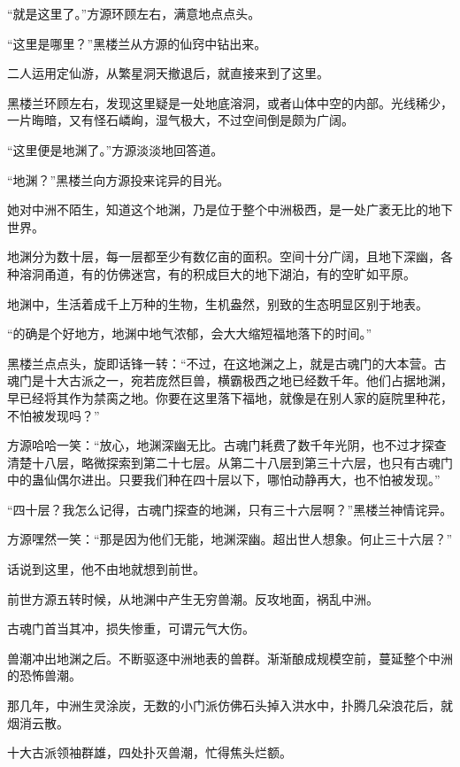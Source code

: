 
\begin{this_body}

“就是这里了。”方源环顾左右，满意地点点头。

“这里是哪里？”黑楼兰从方源的仙窍中钻出来。

二人运用定仙游，从繁星洞天撤退后，就直接来到了这里。

黑楼兰环顾左右，发现这里疑是一处地底溶洞，或者山体中空的内部。光线稀少，一片晦暗，又有怪石嶙峋，湿气极大，不过空间倒是颇为广阔。

“这里便是地渊了。”方源淡淡地回答道。

“地渊？”黑楼兰向方源投来诧异的目光。

她对中洲不陌生，知道这个地渊，乃是位于整个中洲极西，是一处广袤无比的地下世界。

地渊分为数十层，每一层都至少有数亿亩的面积。空间十分广阔，且地下深幽，各种溶洞甬道，有的仿佛迷宫，有的积成巨大的地下湖泊，有的空旷如平原。

地渊中，生活着成千上万种的生物，生机盎然，别致的生态明显区别于地表。

“的确是个好地方，地渊中地气浓郁，会大大缩短福地落下的时间。”

黑楼兰点点头，旋即话锋一转：“不过，在这地渊之上，就是古魂门的大本营。古魂门是十大古派之一，宛若庞然巨兽，横霸极西之地已经数千年。他们占据地渊，早已经将其作为禁脔之地。你要在这里落下福地，就像是在别人家的庭院里种花，不怕被发现吗？”

方源哈哈一笑：“放心，地渊深幽无比。古魂门耗费了数千年光阴，也不过才探查清楚十八层，略微探索到第二十七层。从第二十八层到第三十六层，也只有古魂门中的蛊仙偶尔进出。只要我们种在四十层以下，哪怕动静再大，也不怕被发现。”

“四十层？我怎么记得，古魂门探查的地渊，只有三十六层啊？”黑楼兰神情诧异。

方源嘿然一笑：“那是因为他们无能，地渊深幽。超出世人想象。何止三十六层？”

话说到这里，他不由地就想到前世。

前世方源五转时候，从地渊中产生无穷兽潮。反攻地面，祸乱中洲。

古魂门首当其冲，损失惨重，可谓元气大伤。

兽潮冲出地渊之后。不断驱逐中洲地表的兽群。渐渐酿成规模空前，蔓延整个中洲的恐怖兽潮。

那几年，中洲生灵涂炭，无数的小门派仿佛石头掉入洪水中，扑腾几朵浪花后，就烟消云散。

十大古派领袖群雄，四处扑灭兽潮，忙得焦头烂额。


\end{this_body}
